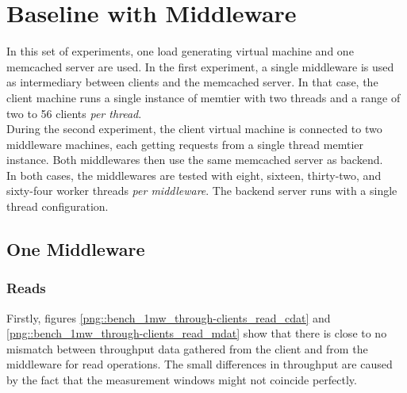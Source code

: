 \documentclass[11pt,a4paper]{article}
\begin{document}
\section{Baseline with Middleware \label{section::net_queues}}
In this set of experiments, one load generating virtual machine and one memcached server are used. In the first experiment, a single middleware is used as intermediary between clients and the memcached server. In that case, the client machine runs a single instance of memtier with two threads and a range of two to 56 clients \textit{per thread}.\\
\indent During the second experiment, the client virtual machine is connected to two middleware machines, each getting requests from a single thread memtier instance. Both middlewares then use the same memcached server as backend.\\
\indent In both cases, the middlewares are tested with eight, sixteen, thirty-two, and sixty-four worker threads \textit{per middleware}. The backend server runs with a single thread configuration.

\subsection{One Middleware}
\subsubsection{Reads}
Firstly, figures \ref{png::bench_1mw_through-clients_read_cdat} and \ref{png::bench_1mw_through-clients_read_mdat} show that there is close to no mismatch between throughput data gathered from the client and from the middleware for read operations. The small differences in throughput are caused by the fact that the measurement windows might not coincide perfectly.
\end{document}
